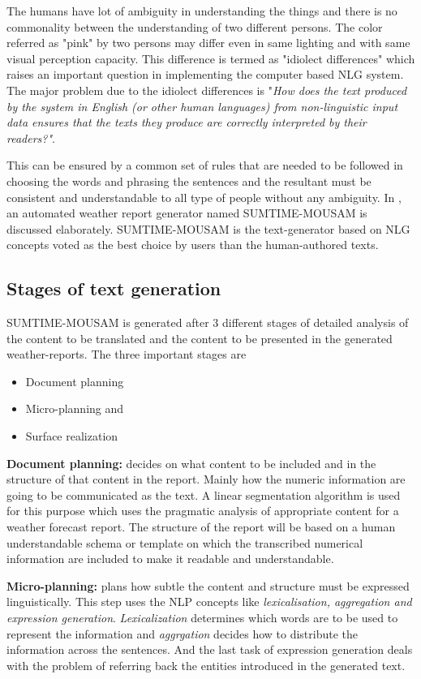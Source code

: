 \documentclass{bmcart}
\begin{document}
The humans have lot of ambiguity in understanding the things and there is no commonality between the understanding of two different persons. The color referred as "pink" by two persons may differ even in same lighting and with same visual perception capacity. This difference is termed as "idiolect differences" which raises an important question in implementing the computer based NLG system. The major problem due to the idiolect differences is "{\it {How does the text produced by the system in English (or other human languages) from non-linguistic input data ensures that the texts they produce are correctly interpreted by their readers?}"}.

This can be ensured by a common set of rules that are needed to be followed in choosing the words and phrasing the sentences and the resultant must be consistent and understandable to all type of people without any ambiguity. In \cite{forecast}, an automated weather report generator named SUMTIME-MOUSAM is discussed elaborately. SUMTIME-MOUSAM is the text-generator based on NLG concepts  voted as the best choice by users than the human-authored texts.

\subsection{Stages of text generation}
\label{ssec:stages}
SUMTIME-MOUSAM  is generated after 3 different stages of detailed analysis of the content to be translated and the content to be presented in the generated weather-reports. The three important stages are
\begin{itemize}
\item Document planning
\item Micro-planning and
\item Surface realization
\end{itemize}

{\bf Document planning: } decides on what content to be included and in the structure of that content in the report.  Mainly how the numeric information are going to be communicated as the text. A linear segmentation algorithm is used for this purpose which uses the pragmatic analysis of appropriate content for a weather forecast report. The structure of the report will be based on a human understandable schema or template on which the transcribed numerical information are included to make it readable and understandable.

{\bf Micro-planning: } plans how subtle the content and structure must be expressed linguistically. 	This step uses the NLP concepts like {\it lexicalisation, aggregation and expression generation}. {\it Lexicalization} determines which words are to be used to represent the information and {\it aggrgation} decides how to distribute the information across the sentences. And the last task of expression generation deals with the problem of referring back the entities introduced in the generated text.
\end{document}
